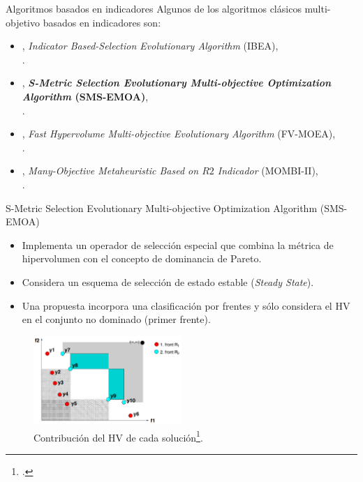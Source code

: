 \documentclass{beamer}
\begin{document}
\begin{frame}{Algoritmos basados en indicadores}
Algunos de los algoritmos clásicos multi-objetivo basados en indicadores son:
\begin{itemize}
\scriptsize
   \item \citeyear{Joel:IBEA}, \textit{Indicator Based-Selection Evolutionary Algorithm } (IBEA), \\ \citeauthor{Joel:IBEA}.
   \item \citeyear{Joel:SMSEMOA}, \textbf{\textit{S-Metric Selection Evolutionary Multi-objective Optimization Algorithm} (SMS-EMOA)}, \\ \citeauthor{Joel:SMSEMOA}.
   \item \citeyear{Joel:FV-MOEA}, \textit{Fast Hypervolume Multi-objective Evolutionary Algorithm} (FV-MOEA), \\ \citeauthor{Joel:FV-MOEA}.
   \item \citeyear{Joel:MOMBI-II}, \textit{Many-Objective Metaheuristic Based on $R2$ Indicador} (MOMBI-II), \\ \citeauthor{Joel:MOMBI-II}.
\end{itemize}
\end{frame}



\begin{frame}{S-Metric Selection Evolutionary Multi-objective Optimization Algorithm (SMS-EMOA)}
\begin{itemize}
\scriptsize
\item Implementa un operador de selección especial que combina la métrica de hipervolumen con el concepto de dominancia de Pareto.
%
\item Considera un esquema de selección de estado estable (\textit{Steady State}).
\item Una propuesta incorpora una clasificación por frentes y sólo considera el HV en el conjunto no dominado (primer frente).
\end{itemize}
\begin{figure}[H]
\centering
\includegraphics[width=0.5\textwidth]{Images/sms_emoa.png}
\caption{\scriptsize Contribución del HV de cada solución\footcite{Joel:SMSEMOA}.}
\end{figure}
\end{frame}
\end{document}
